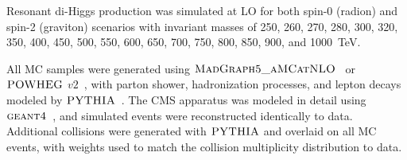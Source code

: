Resonant di-Higgs production was simulated at LO for both spin-0 (radion) and spin-2 (graviton)
scenarios with invariant masses of 250, 260, 270, 280, 300, 320, 350, 400, 450, 500, 550, 600,
650, 700, 750, 800, 850, 900, and 1000~TeV.

All MC samples were generated using $\textsc{MadGraph5\_aMCatNLO}$~\cite{MadGraph5_aMCatNLO} or
$\textsc{POWHEG}$ $v2$~\cite{POWHEG1,POWHEG2,POWHEG3}, with parton shower, hadronization
processes, and \Pgt lepton decays modeled by
$\textsc{PYTHIA}$~\cite{PYTHIA_CUETP8M1tune_CMS,PYTHIA_CUETP8M2tune_CMS,CP5tune_CMS,PYTHIA_MonashTune}.
The CMS apparatus was modeled in detail using $\textsc{geant4}$~\cite{geant4}, and simulated events
were reconstructed identically to data.  Additional collisions were generated with $\textsc{PYTHIA}$ and
overlaid on all MC events, with weights used to match the collision multiplicity distribution to data.
